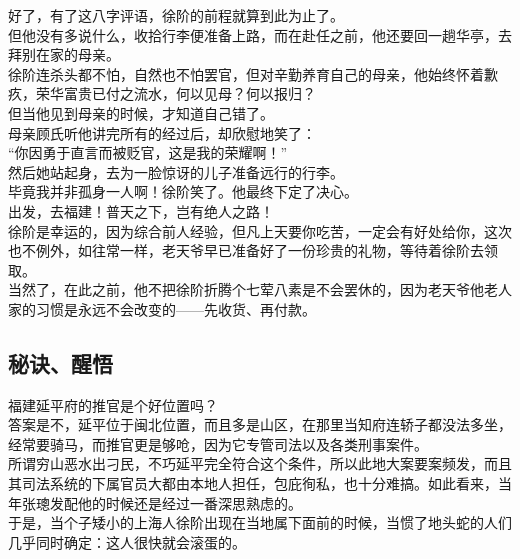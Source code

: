 \begin{multicols}{\theparacolNo}
好了，有了这八字评语，徐阶的前程就算到此为止了。\\

但他没有多说什么，收拾行李便准备上路，而在赴任之前，他还要回一趟华亭，去拜别在家的母亲。\\

徐阶连杀头都不怕，自然也不怕罢官，但对辛勤养育自己的母亲，他始终怀着歉疚，荣华富贵已付之流水，何以见母？何以报归？\\

但当他见到母亲的时候，才知道自己错了。\\

母亲顾氏听他讲完所有的经过后，却欣慰地笑了：\\

“你因勇于直言而被贬官，这是我的荣耀啊！”\\

然后她站起身，去为一脸惊讶的儿子准备远行的行李。\\

毕竟我并非孤身一人啊！徐阶笑了。他最终下定了决心。\\

出发，去福建！普天之下，岂有绝人之路！\\

徐阶是幸运的，因为综合前人经验，但凡上天要你吃苦，一定会有好处给你，这次也不例外，如往常一样，老天爷早已准备好了一份珍贵的礼物，等待着徐阶去领取。\\

当然了，在此之前，他不把徐阶折腾个七荤八素是不会罢休的，因为老天爷他老人家的习惯是永远不会改变的——先收货、再付款。\\

\subsection{秘诀、醒悟}
福建延平府的推官是个好位置吗？\\

答案是不，延平位于闽北位置，而且多是山区，在那里当知府连轿子都没法多坐，经常要骑马，而推官更是够呛，因为它专管司法以及各类刑事案件。\\

所谓穷山恶水出刁民，不巧延平完全符合这个条件，所以此地大案要案频发，而且其司法系统的下属官员大都由本地人担任，包庇徇私，也十分难搞。如此看来，当年张璁发配他的时候还是经过一番深思熟虑的。\\

于是，当个子矮小的上海人徐阶出现在当地属下面前的时候，当惯了地头蛇的人们几乎同时确定：这人很快就会滚蛋的。\\


\end{multicols}

